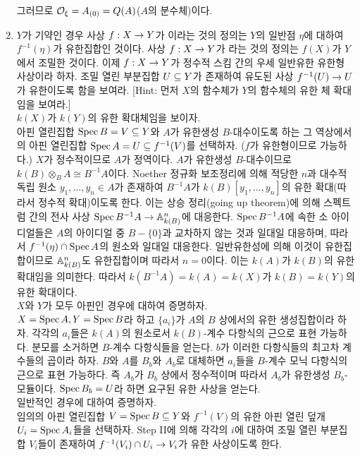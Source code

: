 \begin{enumerate}[label=\tb{3.\arabic*.},itemindent=0mm,itemsep=4mm]
	그러므로 $\mathcal{O}_\xi=A_{(0)}=Q(A)$($A$의 분수체)이다.
	\item $Y$가 기약인 경우 사상 $f:X\rightarrow Y$가 이라는 것의 정의는
	$Y$의 일반점 $\eta$에 대하여 $f^{-1}(\eta)$가 유한집합인 것이다.
	사상 $f:X\rightarrow Y$가 라는 것의 정의는 $f(X)$가 $Y$에서 조밀한 것이다.
	이제 $f:X\rightarrow Y$가 정수적 스킴 간의 우세 일반유한 유한형 사상이라 하자.
	조밀 열린 부분집합 $U\subseteq Y$가 존재하여 유도된 사상 $f^{-1}(U)\rightarrow U$가 유한이도록 함을 보여라.
	[Hint: 먼저 $X$의 함수체가 $Y$의 함수체의 유한 체 확대임을 보여라.]\\
	\sol {} $k(X)$가 $k(Y)$의 유한 확대체임을 보이자.\\
	아핀 열린집합 $\operatorname{Spec} B=V\subseteq Y$와 $A$가 유한생성 $B$-대수이도록 하는
	그 역상에서의 아핀 열린집합 $\operatorname{Spec} A=U\subseteq f^{-1}(V)$를 선택하자. ($f$가 유한형이므로 가능하다.)
	$X$가 정수적이므로 $A$가 정역이다. $A$가 유한생성 $B$-대수이므로 $k(B)\otimes_BA\cong B^{-1}A$이다.
	Noether 정규화 보조정리에 의해 적당한 $n$과 대수적 독립 원소 $y_1,\ldots,y_n\in A$가 존재하여
	$B^{-1}A$가 $k(B)[y_1,\ldots,y_n]$의 유한 확대(따라서 정수적 확대)이도록 한다.
	이는 상승 정리(going up theorem)에 의해 스펙트럼 간의 전사 사상 $\operatorname{Spec} B^{-1}A\rightarrow\mathbb{A}^n_{k(B)}$에 대응한다.
	$\operatorname{Spec} B^{-1}A$에 속한 소 아이디얼들은 $A$의 아이디얼 중 $B-\{0\}$과 교차하지 않는 것과 일대일 대응하며,
	따라서 $f^{-1}(\eta)\cap\operatorname{Spec} A$의 원소와 일대일 대응한다.
	일반유한성에 의해 이것이 유한집합이므로 $\mathbb{A}^n_{k(B)}$도 유한집합이며 따라서 $n=0$이다.
	이는 $k(A)$가 $k(B)$의 유한 확대임을 의미한다. 따라서 $k(B^{-1}A)=k(A)=k(X)$가 $k(B)=k(Y)$의 유한 확대이다.\\
	 $X$와 $Y$가 모두 아핀인 경우에 대하여 증명하자.\\
	$X=\operatorname{Spec} A,Y=\operatorname{Spec} B$라 하고 $\{a_i\}$가 $A$의 $B$ 상에서의 유한 생성집합이라 하자.
	각각의 $a_i$들은 $k(A)$의 원소로서 $k(B)$-계수 다항식의 근으로 표현 가능하다.
	분모를 소거하면 $B$-계수 다항식들을 얻는다. $b$가 이러한 다항식들의 최고차 계수들의 곱이라 하자.
	$B$와 $A$를 $B_b$와 $A_b$로 대체하면 $a_i$들을 $B$-계수 모닉 다항식의 근으로 표현 가능하다.
	즉 $A_b$가 $B_b$ 상에서 정수적이며 따라서 $A_b$가 유한생성 $B_b$-모듈이다. $\operatorname{Spec} B_b=U$라 하면 요구된 유한 사상을 얻는다.\\
	 일반적인 경우에 대하여 증명하자.\\
	임의의 아핀 열린집합 $V=\operatorname{Spec} B\subseteq Y$와 $f^{-1}(V)$의 유한 아핀 열린 덮개 $U_i=\operatorname{Spec} A_i$들을 선택하자.
	Step II에 의해 각각의 $i$에 대하여 조밀 열린 부분집합 $V_i$들이 존재하여 $f^{-1}(V_i)\cap U_i\rightarrow V_i$가 유한 사상이도록 한다.

\end{enumerate}
